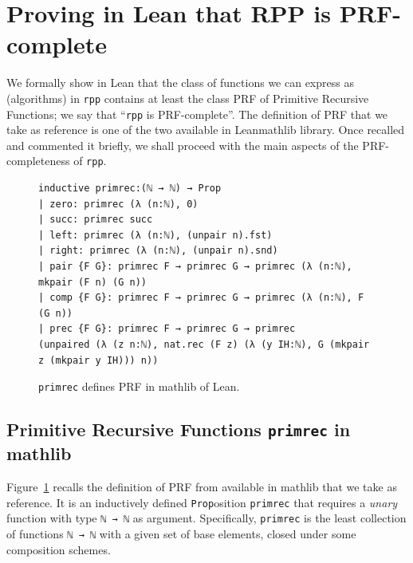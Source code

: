 \documentclass[preprint]{elsarticle}
\theoremstyle{remark}
\newcommand{\RPP}{\textsf{RPP}\xspace}
\newcommand{\PRF}{\textsf{PRF}\xspace}
\newcommand{\MATHLIB}{\textsf{mathlib}\xspace}
\newcommand{\LEAN}{\textsf{Lean}\xspace}
\begin{document}
\section{Proving in \LEAN that \RPP is \PRF-complete}
\label{section:The UPRF-completeness of RPP}
We formally show in \LEAN that the class of functions we can express as (algorithms) in \lstinline|rpp| contains at least the class \PRF of Primitive Recursive Functions; we say that ``\lstinline|rpp| is \PRF-complete''. The definition of \PRF that we take as reference is one of the two available in \LEAN \MATHLIB library. Once recalled and commented it briefly, we shall proceed with the main aspects of the \PRF-completeness of \lstinline|rpp|.


\begin{figure}
\begin{lstlisting}[basicstyle=\small]
inductive primrec:(ℕ → ℕ) → Prop
| zero: primrec (λ (n:ℕ), 0)
| succ: primrec succ
| left: primrec (λ (n:ℕ), (unpair n).fst)
| right: primrec (λ (n:ℕ), (unpair n).snd)
| pair {F G}: primrec F → primrec G → primrec (λ (n:ℕ), mkpair (F n) (G n))
| comp {F G}: primrec F → primrec G → primrec (λ (n:ℕ), F (G n))
| prec {F G}: primrec F → primrec G → primrec
(unpaired (λ (z n:ℕ), nat.rec (F z) (λ (y IH:ℕ), G (mkpair z (mkpair y IH))) n))
\end{lstlisting}
\caption{\lstinline|primrec| defines \PRF in \MATHLIB of \LEAN.}
\label{fig: primrec}
\end{figure}


\subsection{Primitive Recursive Functions \texttt{primrec} in \MATHLIB }
\label{section:Unary Primitive Recursive Functions}

Figure~\ref{fig: primrec} recalls the definition of \PRF from \cite{Carneiro-primrecMathlib} available in \MATHLIB that we take as reference. It is an inductively defined \lstinline|Prop|osition \lstinline|primrec| that requires a \emph{unary} function with type \lstinline|ℕ → ℕ| as argument. Specifically, \lstinline|primrec| is the least collection of functions \lstinline|ℕ → ℕ| with a given set of base elements, closed under some composition schemes.
\end{document}

